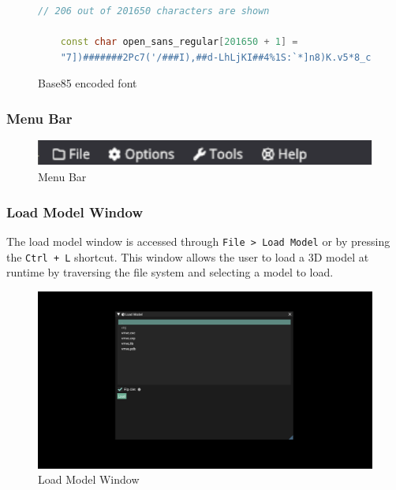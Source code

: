 \documentclass[11pt]{article}
\begin{document}
\begin{figure}[H]
  \centering
  \begin{lstlisting}[language=C++]
    // 206 out of 201650 characters are shown

    const char open_sans_regular[201650 + 1] =
    "7])#######2Pc7('/###I),##d-LhLjKI##4%1S:`*]n8)K.v5*8_c)iZ;99=$$$$c(m]4pKdp/(RdL<snZo'oI,hLNDnx4Uu/>8Q7oo^eFb3hB4JYc'Tx-3l_wgd2Tf._r+&sAqV,-G"":F8LD=5,n]A&aA+<gXG-<iobW&>$>QJ8Z.W$jg0Fv-o^(^JJnf4T"
  \end{lstlisting}
  \caption{Base85 encoded font}
  \label{fig:base85_font}
\end{figure}

\subsubsection{Menu Bar}

\begin{figure}[H]
  \centering
  \includegraphics[width=\textwidth]{images/menu_bar.png}
  \caption{Menu Bar}
  \label{fig:menu_bar}
\end{figure}


\subsubsection{Load Model Window}
The load model window is accessed through \lstinline{File > Load Model} or by
pressing the \lstinline{Ctrl + L} shortcut. This window allows the user to load
a 3D model at runtime by traversing the file system and selecting a model to
load.

\begin{figure}[H]
  \centering
  \includegraphics[width=\textwidth]{images/load_model_window.png}
  \caption{Load Model Window}
  \label{fig:load_model_window}
\end{figure}
\end{document}
